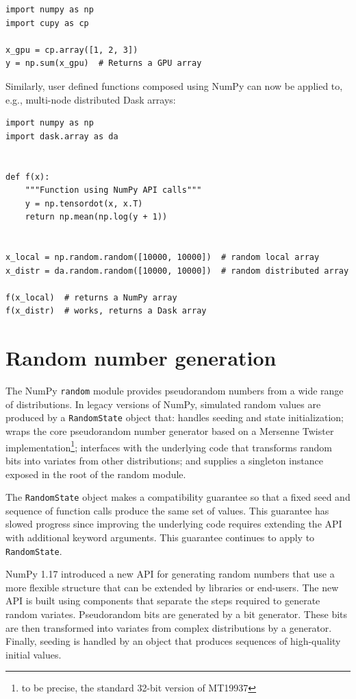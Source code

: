 \begin{lstlisting}
import numpy as np
import cupy as cp

x_gpu = cp.array([1, 2, 3])
y = np.sum(x_gpu)  # Returns a GPU array
\end{lstlisting}

Similarly, user defined functions composed using NumPy can now be
applied to, e.g., multi-node distributed Dask arrays:

\begin{lstlisting}
import numpy as np
import dask.array as da


def f(x):
    """Function using NumPy API calls"""
    y = np.tensordot(x, x.T)
    return np.mean(np.log(y + 1))


x_local = np.random.random([10000, 10000])  # random local array
x_distr = da.random.random([10000, 10000])  # random distributed array

f(x_local)  # returns a NumPy array
f(x_distr)  # works, returns a Dask array
\end{lstlisting}

\section*{Random number generation}

The NumPy \texttt{random} module provides pseudorandom numbers from a wide range of
distributions. In legacy versions of NumPy, simulated random values are produced
by a \texttt{RandomState} object that: handles seeding and state initialization;
wraps the core pseudorandom number generator based on a Mersenne Twister
implementation\footnote{to be precise, the standard 32-bit version of MT19937};
interfaces with the underlying code that transforms random bits into
variates from other distributions; and supplies a singleton instance exposed in
the root of the random module.

The \texttt{RandomState} object makes a compatibility guarantee so that a fixed
seed and sequence of function calls produce the same set of values. This
guarantee has slowed progress since improving the underlying code requires
extending the API with additional keyword arguments. This guarantee continues to
apply to \texttt{RandomState}.

NumPy 1.17 introduced a new API for generating random numbers that use a more
flexible structure that can be extended by libraries or end-users. The new API
is built using components that separate the steps required to generate random
variates. Pseudorandom bits are generated by a bit generator. These bits are
then transformed into variates from complex distributions by a generator.
Finally, seeding is handled by an object that produces sequences of high-quality
initial values.

